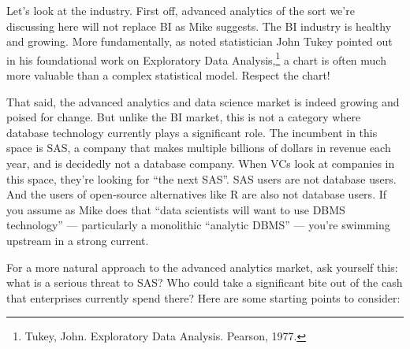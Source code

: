 \documentclass[b5paper,11pt,twoside,openright]{book}
\begin{document}
Let's look at the industry. First off, advanced analytics of the sort
we're discussing here will not replace BI as Mike suggests. The BI
industry is healthy and growing. More fundamentally, as noted
statistician John Tukey pointed out in his foundational work on
Exploratory Data Analysis,\footnote{Tukey, John. Exploratory Data Analysis. Pearson,
  1977.} a
chart is often much more valuable than a complex statistical model.
Respect the chart!

That said, the advanced analytics and data science market is indeed
growing and poised for change. But unlike the BI market, this is not a
category where database technology currently plays a significant role.
The incumbent in this space is SAS, a company that makes multiple
billions of dollars in revenue each year, and is decidedly not a
database company. When VCs look at companies in this space, they're
looking for ``the next SAS''. SAS users are not database users. And the
users of open-source alternatives like R are also not database users. If
you assume as Mike does that ``data scientists will want to use DBMS
technology'' --- particularly a monolithic ``analytic DBMS'' --- you're
swimming upstream in a strong current.

For a more natural approach to the advanced analytics market, ask
yourself this: what is a serious threat to SAS? Who could take a
significant bite out of the cash that enterprises currently spend there?
Here are some starting points to consider:
\end{document}

